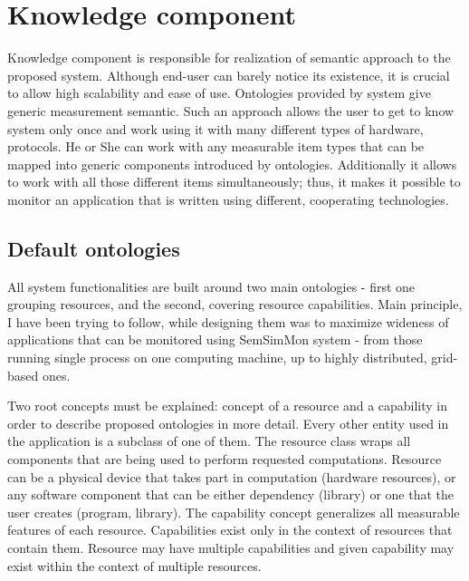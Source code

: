 %
\section{Knowledge component}
\label{sec:arch_knowledge}

Knowledge component is responsible for realization of semantic approach to the proposed system. Although end-user can barely notice its existence, it is crucial to allow high scalability and ease of use. Ontologies provided by system give generic measurement semantic. Such an approach allows the user to get to know system only once and work using it with many different types of hardware, protocols. He or She can work with any measurable item types that can be mapped into generic components introduced by ontologies. Additionally it allows to work with all those different items simultaneously; thus, it makes it possible to monitor an application that is written using different, cooperating technologies.

\subsection{Default ontologies}

All system functionalities are built around two main ontologies - first one grouping resources, and the second, covering resource capabilities. Main principle, I have been trying to follow, while designing them was to maximize wideness of applications that can be monitored using SemSimMon system - from those running single process on one computing machine, up to highly distributed, grid-based ones.

Two root concepts must be explained: concept of a resource and a capability in order to describe proposed ontologies in more detail. Every other entity used in the application is a subclass of one of them. The resource class wraps all components that are being used to perform requested computations. Resource can be a physical device that takes part in computation (hardware resources), or any software component that can be either dependency (library) or one that the user creates (program, library). The capability concept generalizes all measurable features of each resource. Capabilities exist only in the context of resources that contain them. Resource may have multiple capabilities and given capability may exist within the context of multiple resources.

